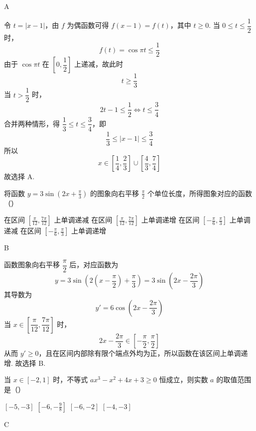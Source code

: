 \begin{answer}
A
\end{answer}

\begin{solution}
令 \(t=|x-1|\)，由 \(f\) 为偶函数可得 \(f(x-1)=f(t)\)，其中 \(t\geqslant0\). 当 \(0\leqslant t\leqslant\dfrac12\) 时，
\[
f(t)=\cos\pi t\leqslant\frac12
\]
由于 \(\cos\pi t\) 在 \(\left[0,\dfrac12\right]\) 上递减，故此时
\[
t\geqslant\frac13
\]
当 \(t>\dfrac12\) 时，
\[
2t-1\leqslant\frac12\iff t\leqslant\frac34
\]
合并两种情形，得 \(\dfrac13\leqslant t\leqslant\dfrac34\)，即
\[
\frac13\leqslant|x-1|\leqslant\frac34
\]
所以
\[
x\in\left[\frac14,\frac23\right]\cup\left[\frac43,\frac74\right]
\]
故选择 A.
\end{solution}

\begin{problem}
将函数 \( y = 3\sin \left(2x + \frac{\pi}{3}\right) \) 的图象向右平移 \( \frac{\pi}{2} \) 个单位长度，所得图象对应的函数（\quad）

\choices
    {在区间 \(\left[\frac{\pi}{12}, \frac{7\pi}{12}\right]\) 上单调递减}
    {在区间 \(\left[\frac{\pi}{12}, \frac{7\pi}{12}\right]\) 上单调递增}
    {在区间 \(\left[-\frac{\pi}{6}, \frac{\pi}{3}\right]\) 上单调递减}
    {在区间 \(\left[-\frac{\pi}{6}, \frac{\pi}{3}\right]\) 上单调递增}
\end{problem}

\begin{answer}
B
\end{answer}

\begin{solution}
函数图象向右平移 \(\dfrac{\pi}{2}\) 后，对应函数为
\[
y=3\sin\left(2\left(x-\frac{\pi}{2}\right)+\frac{\pi}{3}\right)=3\sin\left(2x-\frac{2\pi}{3}\right)
\]
其导数为
\[
y'=6\cos\left(2x-\frac{2\pi}{3}\right)
\]
当 \(x\in\left[\dfrac{\pi}{12},\dfrac{7\pi}{12}\right]\) 时，
\[
2x-\frac{2\pi}{3}\in\left[-\frac{\pi}{2},\frac{\pi}{2}\right]
\]
从而 \(y'\geqslant0\)，且在区间内部除有限个端点外均为正，所以函数在该区间上单调递增. 故选择 B.
\end{solution}

\begin{problem}
当 \(x \in [-2, 1]\) 时，不等式 \(ax^3 - x^2 + 4x + 3 \geqslant 0\) 恒成立，则实数 \(a\) 的取值范围是（\quad）

\choices
    {\([-5, - 3]\)}
    {\(\left[-6, -\frac{9}{8}\right]\)}
    {\([-6, - 2]\)}
    {\([-4, - 3]\)}
\end{problem}

\begin{answer}
C
\end{answer}

